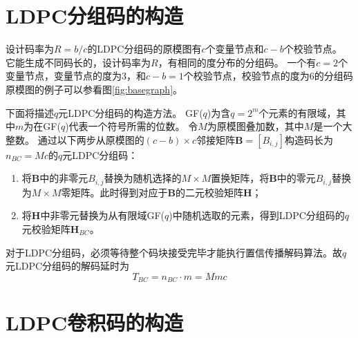 \section{LDPC分组码的构造}
设计码率为$R=b/c$的LDPC分组码的原模图有$c$个变量节点和$c-b$个校验节点。
它能生成不同码长的，设计码率为$R$，有相同的度分布的分组码。
一个有$c=2$个变量节点，变量节点的度为3，和$c-b=1$个校验节点，校验节点的度为6的分组码原模图的例子可以参看图\ref{fig:basegraph}。

下面将描述$q$元LDPC分组码的构造方法。
GF($q$)为含$q=2^m$个元素的有限域，其中$m$为在GF($q$)代表一个符号所需的位数。
令$M$为原模图叠加数，其中$M$是一个大整数。
通过以下两步从原模图的$(c-b)\times c$邻接矩阵$\mathbf{B}=[B_{i,j}]$构造码长为$n_{BC}=Mc$的$q$元LDPC分组码：
\begin{enumerate}
\item 将$\mathbf{B}$中的非零元$B_{i,j}$替换为随机选择的$M \times M$置换矩阵，将$\mathbf{B}$中的零元$B_{i,j}$替换为$M \times M$零矩阵。此时得到对应于$\mathbf{B}$的二元校验矩阵$\mathbf{H}$；
\item 将$\mathbf{H}$中非零元替换为从有限域GF($q$)中随机选取的元素，得到LDPC分组码的$q$元校验矩阵$\mathbf{H}_{BC}$。
\end{enumerate}
对于LDPC分组码，必须等待整个码块接受完毕才能执行置信传播解码算法。故$q$元LDPC分组码的解码延时为
\begin{equation}
T_{BC}=n_{BC}\cdot m = Mmc
\end{equation}

\section{LDPC卷积码的构造}

